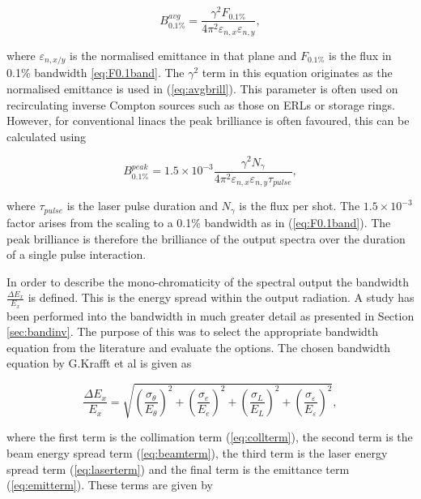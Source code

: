 \documentclass[11pt]{article}
\begin{document}
\begin{equation}
B^{avg}_{0.1\%} = \frac{\gamma^{2}F_{0.1\%}}{4\pi^{2}\varepsilon_{n,x}\varepsilon_{n,y}},
\label{eq:avgbrill}
\end{equation}

\noindent where $\varepsilon_{n,x/y}$ is the normalised emittance in that plane and $F_{0.1\%}$ is the flux in 0.1\% bandwidth \ref{eq:F0.1band}. The $\gamma^{2}$ term in this equation originates as the normalised emittance is used in (\ref{eq:avgbrill}). This parameter is often used on recirculating inverse Compton sources such as those on ERLs or storage rings. However, for conventional linacs the peak brilliance is often favoured, this can be calculated using

\begin{equation}
B^{peak}_{0.1\%} = 1.5\times 10^{-3}\frac{\gamma^{2}N_{\gamma}}{4\pi^{2}\varepsilon_{n,x}\varepsilon_{n,y}\tau_{pulse}},
\label{eq:peakbrill}
\end{equation}

\noindent where $\tau_{pulse}$ is the laser pulse duration and $N_{\gamma}$ is the flux per shot. The $1.5\times 10^{-3}$ factor arises from the scaling to a 0.1\% bandwidth as in (\ref{eq:F0.1band}). The peak brilliance is therefore the brilliance of the output spectra over the duration of a single pulse interaction.

In order to describe the mono-chromaticity of the spectral output the bandwidth $\frac{\Delta E_{x}}{E_{x}}$ is defined. This is the energy spread within the output radiation. A study has been performed into the bandwidth in much greater detail as presented in Section \ref{sec:bandinv}. The purpose of this was to select the appropriate bandwidth equation from the literature and evaluate the options. The chosen bandwidth equation by G.Krafft et al \cite{KrafftBand} is given as

\begin{equation}
\frac{\Delta E_{x}}{E_{x}} = \sqrt{\left(\frac{\sigma_{\theta}}{E_{\theta}}\right)^{2}+\left(\frac{\sigma_{e}}{E_{e}}\right)^{2}+\left(\frac{\sigma_{L}}{E_{L}}\right)^{2}+\left(\frac{\sigma_{\varepsilon}}{E_{\varepsilon}}\right)^{2}},
\label{eq:Bandwidth}
\end{equation}

\noindent where the first term is the collimation term (\ref{eq:collterm}), the second term is the beam energy spread term (\ref{eq:beamterm}), the third term is the laser energy spread term (\ref{eq:laserterm}) and the final term is the emittance term (\ref{eq:emitterm}). These terms are given by
\end{document}
